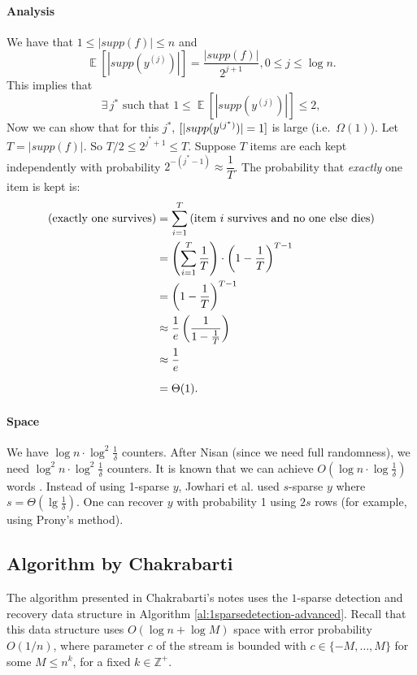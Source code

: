 \documentclass[11pt]{article}
\theoremstyle{plain}
\DeclareMathOperator*{\E}{\mathbb{E}}
\let\Pr\relax
\DeclareMathOperator*{\Pr}{\mathbb{P}}
\begin{document}
\paragraph{Analysis}
We have that $1\leq|supp(f)|\leq n$ and
\[
\E[|{supp(y^{(j)})}|]=\frac{|{supp(f)}|}{2^{j+1}}, 0\leq j\leq \log n.
\]
This implies that
\[
\exists\,j^* \text{ such that }1\leq\E[|{supp(y^{(j)})}|]\leq 2,
\]
Now we can show that for this $j^*$, $\Pr[|supp(y^{(j^*)})|=1]$ is large (i.e.\ 
$\Omega(1)$). Let $T=|{supp(f)}|$. So $T/2\le 2^{j^*+1}\le T$. 
Suppose $T$ items are each kept independently with probability $2^{-(j^*-1)} 
\approx \dfrac{1}{T}$. The probability that {\em exactly} one item is 
kept is: 
\begin{align*}
\Pr(\text{exactly one survives})&=\sum_{i=1}^T\Pr\left(\text{item $i$ survives and 
no one else dies}\right) \\
&=\left(\sum_{i=1}^T\frac{1}{T}\right)\cdot\left(1-\frac{1}{T}\right)^{T-1} \\
&=\left(1-\frac{1}{T}\right)^{T-1} \\
&\approx\frac{1}{e}\left(\frac{1}{1-\frac{1}{T}}\right) \\
&\approx\frac{1}{e} \\[6pt]
&=\Theta(1).
\end{align*}

\paragraph{Space}
We have $\log n\cdot\log^2\frac{1}{\delta}$ counters. After Nisan (since we need 
full randomness), we need $\log^2 n\cdot\log^2\frac{1}{\delta}$ counters. It is 
known that we can achieve $O(\log n\cdot\log\frac{1}{\delta})$ words 
\cite{Jowhari11}. Instead of using 1-sparse $y$, Jowhari et al. used $s$-sparse 
$y$ where $s=\Theta(\lg\frac{1}{\delta})$. One can recover $y$ with probability 
1 using $2s$ rows (for example, using Prony's method).


\subsection{Algorithm by Chakrabarti}
The algorithm presented in Chakrabarti's notes \cite{Cha2015-notes} uses the 
$1$-sparse detection and recovery data structure in Algorithm 
\ref{al:1sparsedetection-advanced}. Recall that this data structure uses $O(\log 
n +\log M)$ space with error probability $O(1/n)$, where parameter $c$ of the 
stream is bounded with $c\in \{-M,\dots,M\}$ 
for some $M\leq n^k$, for a fixed $k\in \mathbb{Z^+}$.
\end{document}
